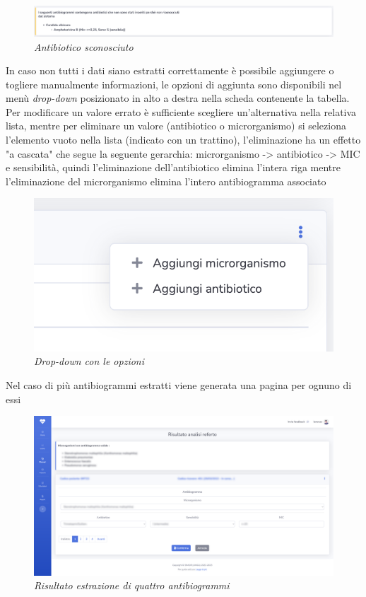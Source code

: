 \begin{figure}[h!]
	\centering
	\includegraphics[width=.99\columnwidth]{images/static_missing_antib.png}
	\caption{\textit{Antibiotico sconosciuto}}
	\label{fig:missing_anti}
\end{figure}
\newpage
In caso non tutti i dati siano estratti correttamente è possibile aggiungere o togliere manualmente informazioni, le opzioni di aggiunta sono disponibili nel menù \textit{drop-down} posizionato in alto a destra nella scheda contenente la tabella.
Per modificare un valore errato è sufficiente scegliere un'alternativa nella relativa lista, mentre per eliminare un valore (antibiotico o microrganismo) si seleziona l'elemento vuoto nella lista (indicato con un trattino), l'eliminazione ha un effetto 
"a cascata" che segue la seguente gerarchia: microrganismo -> antibiotico -> MIC e sensibilità, quindi l'eliminazione dell'antibiotico elimina l'intera riga mentre l'eliminazione del microrganismo elimina l'intero antibiogramma associato
\begin{figure}[h!]
	\centering
	\includegraphics[width=.99\columnwidth]{images/new_object.png}
	\caption{\textit{Drop-down con le opzioni}}
	\label{fig:new_object}
\end{figure}
\newpage
Nel caso di più antibiogrammi estratti viene generata una pagina per ognuno di essi
\begin{figure}[h!]
	\centering
	\includegraphics[width=.99\columnwidth]{images/result_multi.png}
	\caption{\textit{Risultato estrazione di quattro antibiogrammi}}
	\label{fig:result_multi}
\end{figure}
\newpage
